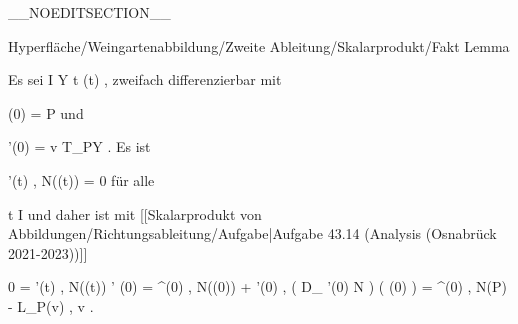 __NOEDITSECTION__

{Hyperfläche/Weingartenabbildung/Zweite Ableitung/Skalarprodukt/Fakt}
{Lemma}
{}
{

\faktzusatz {}
\faktzusatz {}

}
{

Es sei
\maabbeledisp {\gamma} { I } { Y
} { t } { \gamma(t)
} {,}
zweifach differenzierbar mit

\mavergleichskette
{\vergleichskette
{ \gamma(0)
}
{ = }{ P
}
{  }{
}
{    }{
}
{   }{
}
}
{}{}{}
und

\mavergleichskette
{\vergleichskette
{ \gamma'(0)
}
{ = }{ v
}
{ \in }{ T_PY
}
{    }{
}
{   }{
}
}
{}{}{.}
Es ist

\mavergleichskettedisp
{\vergleichskette
{ \left\langle  \gamma'(t)  ,  N(\gamma(t))   \right\rangle
}
{ =} { 0
}
{ } {
}
{ } {
}
{ } {
}
}
{}{}{}
für alle

\mavergleichskette
{\vergleichskette
{ t
}
{ \in }{ I
}
{  }{
}
{    }{
}
{   }{
}
}
{}{}{}
und daher ist mit
[[Skalarprodukt von Abbildungen/Richtungsableitung/Aufgabe|Aufgabe 43.14 (Analysis (Osnabrück 2021-2023))]]

\mavergleichskettealign
{\vergleichskettealign
{ 0
}
{ =} { \left\langle  \gamma'(t)  ,  N(\gamma(t))   \right\rangle' (0)
}
{ =} { \left\langle  \gamma^{\prime \prime}(0)  ,  N(\gamma(0))  \right\rangle + \left\langle  \gamma'(0)  ,  \left(  D_{ \gamma'(0) }  N   \right) \left(   \gamma(0)   \right)   \right\rangle
}
{ =} { \left\langle  \gamma^{\prime \prime}(0) , N(P)  \right\rangle - \left\langle  L_P(v)  ,  v   \right\rangle
}
{ } {
}
}
{}
{}{.}

}

